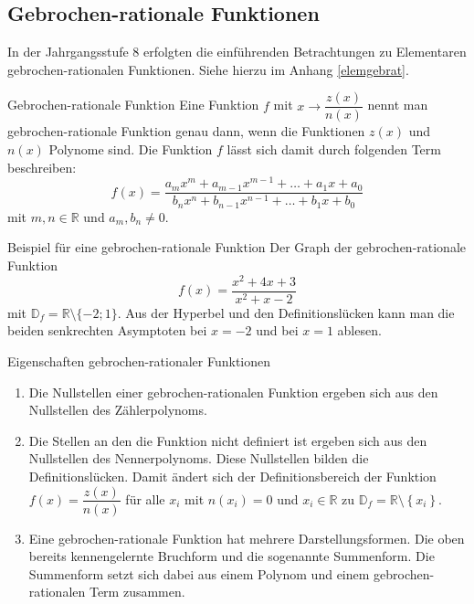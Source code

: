     \subsection{Gebrochen-rationale Funktionen}
In der Jahrgangsstufe 8 erfolgten die einführenden Betrachtungen zu Elementaren gebrochen-rationalen Funktionen. Siehe hierzu im Anhang \ref{elemgebrat}.
 \begin{defi}{Gebrochen-rationale Funktion}{}
Eine Funktion $f$ mit $x\longrightarrow \dfrac{z(x)}{n(x)}$ nennt man gebrochen-rationale Funktion genau dann, wenn die Funktionen $z(x)$ und $n(x)$ Polynome sind. Die Funktion $f$ lässt sich damit durch folgenden Term beschreiben:$$f(x) = \dfrac{a_mx^m + a_{m-1}x^{m-1} + \ldots + a_1 x +a_0}{b_n x^n + b_{n-1}x^{n-1} + \ldots + b_1 x + b_0}$$ mit $m,n \in \mathds{R}$ und $a_m , b_n \neq 0$.
 \end{defi}
 \begin{bsp}{Beispiel für eine gebrochen-rationale Funktion}{} 
Der Graph der gebrochen-rationale Funktion  $$f(x)= \dfrac{x^2+4x+3}{x^2+x-2}$$ mit $\mathds{D}_f = \mathds{R}\setminus \{-2;1\}$. Aus der Hyperbel und den Definitionslücken kann man die beiden senkrechten Asymptoten bei $x=-2$ und bei $x=1$ ablesen.  
\begin{center}
\end{center}
\end{bsp}
 \begin{merke}{Eigenschaften gebrochen-rationaler Funktionen}{}
     \begin{enumerate}
         \item Die Nullstellen einer gebrochen-rationalen Funktion ergeben sich aus den Nullstellen des Zählerpolynoms.
         \item Die Stellen an den die Funktion nicht definiert ist ergeben sich aus den Nullstellen des Nennerpolynoms. Diese Nullstellen bilden die Definitionslücken. Damit ändert sich der Definitionsbereich der Funktion $f(x)= \dfrac{z(x)}{n(x)}$  für alle $x_i$ mit $n(x_i) = 0$ und $x_i \in \mathds{R}$ zu $\mathds{D}_f = \mathds{R}\setminus \left\{x_i\right\}$. 
     \item Eine gebrochen-rationale Funktion hat mehrere Darstellungsformen. Die oben bereits kennengelernte Bruchform und die sogenannte Summenform. Die Summenform setzt sich dabei aus einem Polynom und einem gebrochen-rationalen Term zusammen.
     \end{enumerate}
 \end{merke}

